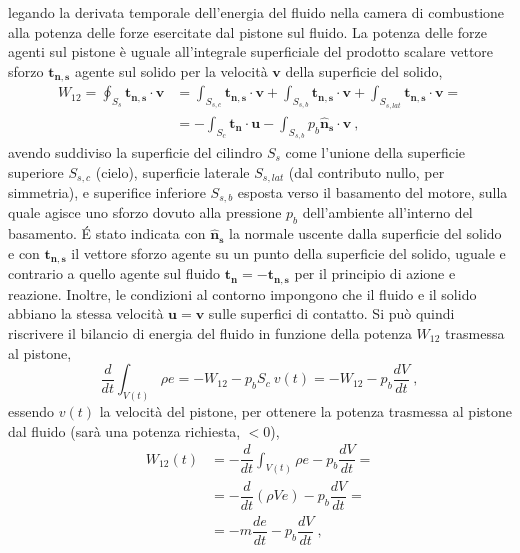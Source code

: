 \begin{itemize}
legando la derivata temporale dell'energia del fluido nella camera di combustione alla potenza delle forze esercitate dal pistone sul fluido. La potenza delle forze agenti sul pistone è uguale all'integrale superficiale del prodotto scalare vettore sforzo $\bm{t_{n,s}}$ agente sul solido per la velocità $\bm{v}$ della superficie del solido,
\begin{equation}
\begin{aligned}
 W_{12} = \oint_{S_{s}} \bm{t_{n,s}} \cdot \bm{v}
 & = \int_{S_{s,c}} \bm{t_{n,s}} \cdot \bm{v} + \int_{S_{s,b}} \bm{t_{n,s}} \cdot \bm{v}  + \int_{S_{s,lat}} \bm{t_{n,s}} \cdot \bm{v} = \\
 & = - \int_{S_{c}} \bm{t_{n}} \cdot \bm{u} - \int_{S_{s,b}} p_b\bm{\hat{n}_{s}} \cdot \bm{v} \ ,
\end{aligned}
\end{equation}
avendo suddiviso la superficie del cilindro $S_s$ come l'unione della superficie superiore $S_{s,c}$ (cielo), superficie laterale $S_{s,lat}$ (dal contributo nullo, per simmetria), e superifice inferiore $S_{s,b}$ esposta verso il basamento del motore, sulla quale agisce uno sforzo dovuto alla pressione $p_b$ dell'ambiente all'interno del basamento. \'E stato indicata con $\bm{\hat{n}_s}$ la normale uscente dalla superficie del solido e con $\bm{t_{n,s}}$ il vettore sforzo agente su un punto della superficie del solido, uguale e contrario a quello agente sul fluido $\bm{t_n} = -\bm{t_{n,s}}$ per il principio di azione e reazione. Inoltre, le condizioni al contorno impongono che il fluido e il solido abbiano la stessa velocità $\bm{u} = \bm{v}$ sulle superfici di contatto.
Si può quindi riscrivere il bilancio di energia del fluido in funzione della potenza $W_{12}$ trasmessa al pistone,
\begin{equation}
  \dfrac{d}{dt} \displaystyle\int_{V(t)} \rho e = - W_{12} - p_b S_{c} \ v(t) = - W_{12} - p_b \dfrac{d V}{d t} \ ,
\end{equation}
essendo $v(t)$ la velocità del pistone, per ottenere la potenza trasmessa al pistone dal fluido (sarà una potenza richiesta, $<0$),
\begin{equation}
\begin{aligned}
  W_{12}(t) & = - \dfrac{d}{dt} \displaystyle\int_{V(t)} \rho e - p_b \dfrac{d V}{d t} = \\
  & = - \dfrac{d}{dt} \left( \rho V e \right) - p_b \dfrac{d V}{d t} = \\
  & = - m \dfrac{d e}{d t} - p_b \dfrac{d V}{d t} \ ,
\end{aligned}

\end{equation}
\end{itemize}
